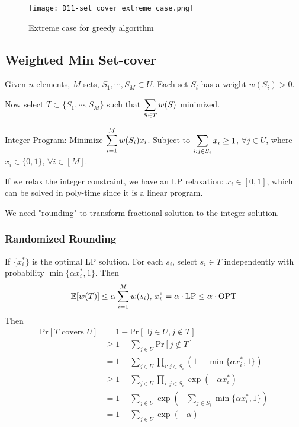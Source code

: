 \begin{figure}[htbp]
    \centering
    \texttt{[image: D11-set\_cover\_extreme\_case.png]}
    \caption{Extreme case for greedy algorithm}
\end{figure}
\subsection{Weighted Min Set-cover}
\begin{example}
    Given  $ n $ elements,  $ M $ sets,  $ S_1,\cdots,S_M\subset U $. Each set  $ S_i $ has a weight  $ w(S_i)>0 $.

    Now select  $ T\subset\{S_1,\cdots, S_M\} $ such that  $ \displaystyle\sum_{S\in T}w(S) $ minimized. 
\end{example}
Integer Program: Minimize  $ \displaystyle\sum_{i=1}^M w(S_i)x_i $. Subject to   $ \displaystyle\sum_{i:j\in S_i} x_i \geq 1$,  $ \forall j\in U $, where  $ x_i\in \{0,1\} $,  $ \forall i\in [M] $.

If we relax the integer constraint, we have an LP relaxation:  $ x_i\in[0,1] $, which can be solved in poly-time since it is a linear program.

We need "rounding" to transform fractional solution to the integer solution.

\subsubsection{Randomized Rounding}
If  $ \{x_i^*\} $ is the optimal LP solution.  For each  $ s_i $, select  $ s_i\in T $ independently with probability   $ \min\{\alpha x_i^*,1\} $. Then 
\[\mathbb E[w(T)] \leq \alpha\sum_{i=1}^M w(s_i),\,x_i^*=\alpha\cdot \mathrm{LP} \leq \alpha\cdot \mathrm{OPT}\] 
Then 
\[\begin{aligned}
    \mathrm{Pr}[T\text{ covers }U]&=1-\mathrm{Pr}[ \exists j\in U , j\not\in T ]\\
    & \geq 1-\sum_{j\in U}\mathrm{Pr}[j\not\in T]\\
    &=1-\sum_{j\in U}\prod_{i: j\in S_i}(1-\min\{\alpha x_i^*,1\})\\
    & \geq 1-\sum_{j\in U}\prod_{i: j\in S_i}\exp(-\alpha x_i^*)\\
    &=1-\sum_{j\in U}\exp(-\sum_{j\in S_i}\min\{\alpha x_i^*,1\})\\
    &=1-\sum_{j\in U}\exp(-\alpha)
\end{aligned}\]